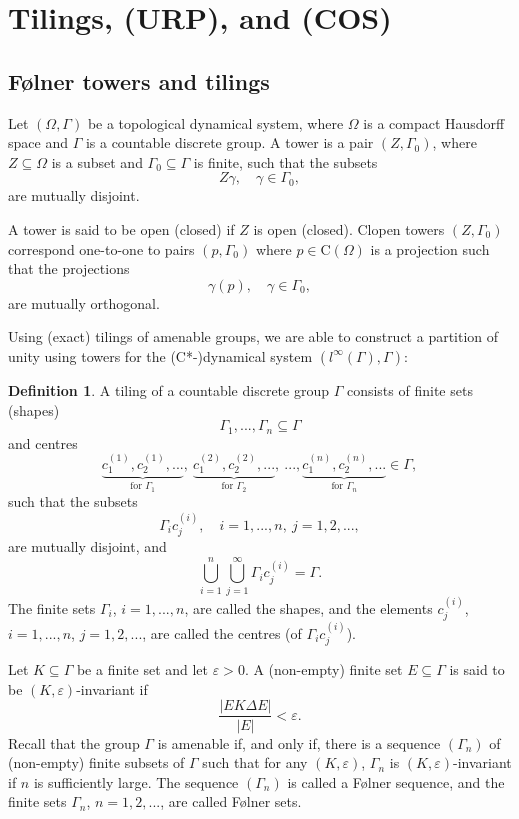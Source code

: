 \documentclass[12pt, oneside, psamsfonts]{amsart}
\theoremstyle{definition}
\newtheorem{defn}[thm]{Definition}
\theoremstyle{remark}
\numberwithin{equation}{section}
\newcommand{\abs}[1]{\left\vert#1\right\vert}
\newcommand{\eps}{\varepsilon}
\begin{document}
\section{Tilings, (URP), and (COS)}


\subsection{F{\o}lner towers and tilings}\label{folner-tiling}
Let $(\Omega, \Gamma)$ be a topological dynamical system, where $\Omega$ is a compact Hausdorff space and $\Gamma$ is a countable discrete group. A tower is a pair $(Z, \Gamma_0)$, where $Z \subseteq \Omega$ is a subset and $\Gamma_0 \subseteq \Gamma$ is finite, such that the subsets $$Z \gamma, \quad \gamma \in \Gamma_0,$$ are mutually disjoint. 

A tower is said to be open (closed) if $Z$ is open (closed). Clopen towers $(Z, \Gamma_0)$ correspond one-to-one to pairs $(p, \Gamma_0)$ where $p \in \mathrm{C}(\Omega)$ is a projection such that the projections $$\gamma(p), \quad \gamma \in \Gamma_0,$$ are mutually orthogonal.

Using (exact) tilings of amenable groups, we are able to construct a partition of unity using towers for the (C*-)dynamical system $(l^\infty(\Gamma), \Gamma)$:
\begin{defn}
A tiling of a countable discrete group $\Gamma$ consists of finite sets (shapes) $$\Gamma_1, ..., \Gamma_n \subseteq \Gamma$$ and centres $$\underbrace{c^{(1)}_1, c^{(1)}_2, ... }_{\textrm{for $\Gamma_1$}},\  \underbrace{c^{(2)}_1, c^{(2)}_2, ... }_{\textrm{for $\Gamma_2$}},\ ..., \underbrace{c^{(n)}_1, c^{(n)}_2, ... }_{\textrm{for $\Gamma_n$}} \in \Gamma, $$ such that the subsets 
$$ \Gamma_ic^{(i)}_j, \quad i=1, ..., n,\ j=1, 2, ... , $$
are mutually disjoint, and
$$\bigcup_{i=1}^n \bigcup_{j=1}^\infty\Gamma_ic^{(i)}_j = \Gamma. $$
The finite sets $\Gamma_i$, $i=1, ..., n$, are called the shapes, and the elements  $c_j^{(i)}$, $i=1, ..., n$, $j=1, 2, ...$, are called the centres (of $\Gamma_i c_j^{(i)}$).
\end{defn}

Let $K \subseteq \Gamma$ be a finite set and let  $\eps>0$.
A (non-empty) finite set $E \subseteq \Gamma$ is said to be $(K, \eps)$-invariant if
$$\frac{\abs{EK \Delta E}}{\abs{E}} < \eps.$$ Recall that the group $\Gamma$ is amenable if, and only if, there is a sequence $(\Gamma_n)$ of (non-empty) finite subsets of $\Gamma$ such that for any $(K, \eps)$, $\Gamma_n$ is $(K, \eps)$-invariant if $n$ is sufficiently large. The sequence $(\Gamma_n)$ is called a
F{\o}lner sequence, and the finite sets $\Gamma_n$, $n=1, 2, ...$, are called F{\o}lner sets. 
\end{document}
